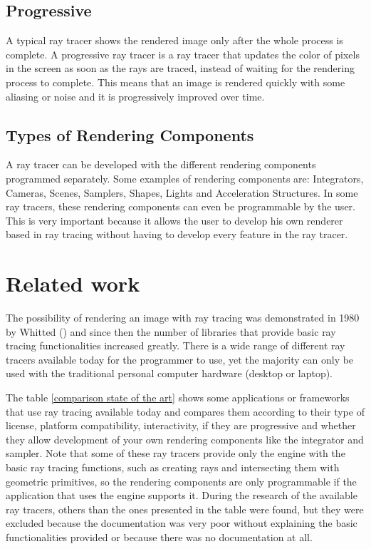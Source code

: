 \subsection{Progressive}

\par
A typical ray tracer shows the rendered image only after the whole process is complete.
A progressive ray tracer is a ray tracer that updates the color of pixels in the screen as soon as the rays are traced, instead of waiting for the rendering process to complete.
This means that an image is rendered quickly with some aliasing or noise and it is progressively improved over time.

\subsection{Types of Rendering Components}

\par
A ray tracer can be developed with the different rendering components programmed separately.
Some examples of rendering components are: Integrators, Cameras, Scenes, Samplers, Shapes, Lights and Acceleration Structures.
In some ray tracers, these rendering components can even be programmable by the user.
This is very important because it allows the user to develop his own renderer based in ray tracing without having to develop every feature in the ray tracer.

\section{Related work}
\label{RelatedWork}

\par
The possibility of rendering an image with ray tracing was demonstrated in 1980 by Whitted (\cite {RT_classic}) and since then the number of libraries that provide basic ray tracing functionalities increased greatly.
There is a wide range of different ray tracers available today for the programmer to use, yet the majority can only be used with the traditional personal computer hardware (desktop or laptop).

\par
The table \ref{comparison state of the art} shows some applications or frameworks that use ray tracing available today and compares them according to their type of license, platform compatibility, interactivity, if they are progressive and whether they allow development of your own rendering components like the integrator and sampler.
Note that some of these ray tracers provide only the engine with the basic ray tracing functions, such as creating rays and intersecting them with geometric primitives, so the rendering components are only programmable if the application that uses the engine supports it.
During the research of the available ray tracers, others than the ones presented in the table were found, but they were excluded because the documentation was very poor without explaining the basic functionalities provided or because there was no documentation at all.

